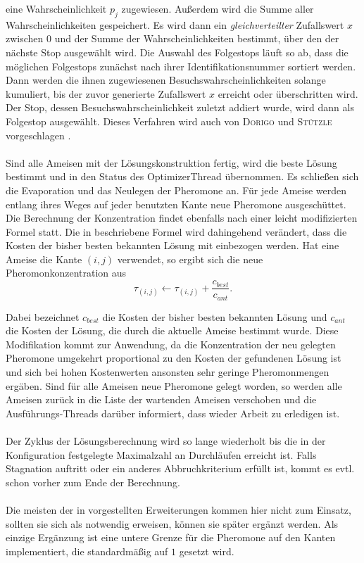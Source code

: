 \noindent
eine Wahrscheinlichkeit $p_j$ zugewiesen. Außerdem wird die Summe aller Wahrscheinlichkeiten gespeichert. Es wird dann ein \emph{gleichverteilter} Zufallswert $x$ zwischen $0$ und der Summe der Wahrscheinlichkeiten bestimmt, über den der nächste Stop ausgewählt wird. Die Auswahl des Folgestops läuft so ab, dass die möglichen Folgestops zunächst nach ihrer Identifikationsnummer sortiert werden. Dann werden die ihnen zugewiesenen Besuchswahrscheinlichkeiten solange kumuliert, bis der zuvor generierte Zufallswert $x$ erreicht oder überschritten wird. Der Stop, dessen Besuchswahrscheinlichkeit zuletzt addiert wurde, wird dann als Folgestop ausgewählt. Dieses Verfahren wird auch von \textsc{Dorigo} und \textsc{Stützle} vorgeschlagen \cite{Dorigo}. \\
\\
Sind alle Ameisen mit der Lösungskonstruktion fertig, wird die beste Lösung bestimmt und in den Status des \textsf{OptimizerThread} übernommen. Es schließen sich die Evaporation und das Neulegen der Pheromone an. Für jede Ameise werden entlang ihres Weges auf jeder benutzten Kante neue Pheromone ausgeschüttet. Die Berechnung der Konzentration findet ebenfalls nach einer leicht modifizierten Formel statt. Die in  beschriebene Formel wird dahingehend verändert, dass die Kosten der bisher besten bekannten Lösung mit einbezogen werden. Hat eine Ameise die Kante $(i,j)$ verwendet, so ergibt sich die neue Pheromonkonzentration aus
\begin{equation}
\tau_{(i,j)} \leftarrow \tau_{(i,j)} + \frac{c_{best}}{c_{ant}}.
\end{equation}

\noindent
Dabei bezeichnet $c_{best}$ die Kosten der bisher besten bekannten Lösung und $c_{ant}$ die Kosten der Lösung, die durch die aktuelle Ameise bestimmt wurde. Diese Modifikation kommt zur Anwendung, da die Konzentration der neu gelegten Pheromone umgekehrt proportional zu den Kosten der gefundenen Lösung ist und sich bei hohen Kostenwerten ansonsten sehr geringe Pheromonmengen ergäben. Sind für alle Ameisen neue Pheromone gelegt worden, so werden alle Ameisen zurück in die Liste der wartenden Ameisen verschoben und die Ausführungs-Threads darüber informiert, dass wieder Arbeit zu erledigen ist. \\
\\
Der Zyklus der Lösungsberechnung wird so lange wiederholt bis die in der Konfiguration festgelegte Maximalzahl an Durchläufen erreicht ist. Falls Stagnation auftritt oder ein anderes Abbruchkriterium erfüllt ist, kommt es evtl. schon vorher zum Ende der Berechnung. \\
\\
Die meisten der in  vorgestellten Erweiterungen kommen hier nicht zum Einsatz, sollten sie sich als notwendig erweisen, können sie später ergänzt werden. Als einzige Ergänzung ist eine untere Grenze für die Pheromone auf den Kanten implementiert, die standardmäßig auf $1$ gesetzt wird.


